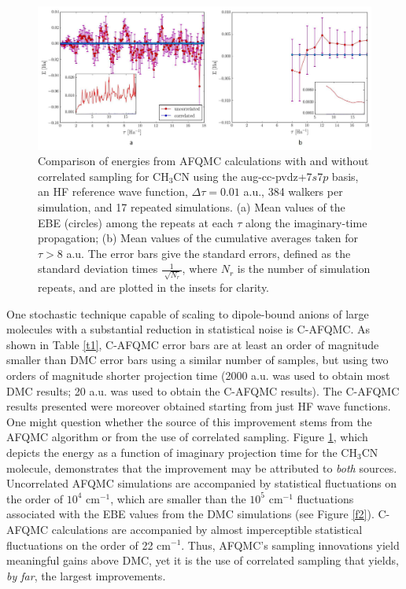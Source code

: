 \begin{center}
\begin{figure}[htbp]
\includegraphics[width=15cm]{Images/chapter2/correlated_sampling.pdf}
\caption{Comparison of energies from AFQMC calculations with and without correlated sampling for CH$_{3}$CN using the aug-cc-pvdz+7$s$7$p$ basis, an HF reference wave function, $\Delta \tau=0.01$ a.u., 384 walkers per simulation, and 17 repeated simulations. (a) Mean values of the EBE (circles) among the repeats at each $\tau$ along the imaginary-time propagation; (b) Mean values of the cumulative averages taken for $\tau > 8$ a.u. The error bars give the standard errors, defined as the standard deviation times $\frac{1}{\sqrt[]{N_r}}$, where $N_r$ is the number of simulation repeats, and are plotted in the insets for clarity.}
\label{f3}
\end{figure}
\end{center}
One stochastic technique capable of scaling to dipole-bound anions of large molecules with a substantial reduction in statistical noise is C-AFQMC. As shown in Table \ref{t1}, C-AFQMC error bars are at least an order of magnitude smaller than DMC error bars using
a similar number of samples, but using two orders of magnitude shorter projection time (2000 a.u. was used to obtain most DMC results; 20 a.u. was used to obtain the C-AFQMC results). The C-AFQMC results presented were moreover obtained starting from just HF wave functions. One might question whether the source of this improvement stems from the AFQMC algorithm or from the use of correlated sampling. Figure \ref{f3}, which depicts the energy as a function of imaginary projection time for the CH$_{3}$CN molecule, demonstrates that the improvement may be attributed to \textit{both} sources. Uncorrelated AFQMC simulations are accompanied by statistical fluctuations on the order of $10^{4}$ cm$^{-1}$, which are smaller than the $10^{5}$ cm$^{-1}$ fluctuations associated with the EBE values from the DMC simulations (see Figure \ref{f2}). C-AFQMC calculations are accompanied by almost imperceptible statistical fluctuations on the order of 22 cm$^{-1}$. Thus, AFQMC's sampling innovations yield meaningful gains above DMC, yet it is the use of correlated sampling that yields, \textit{by far}, the largest improvements. 

